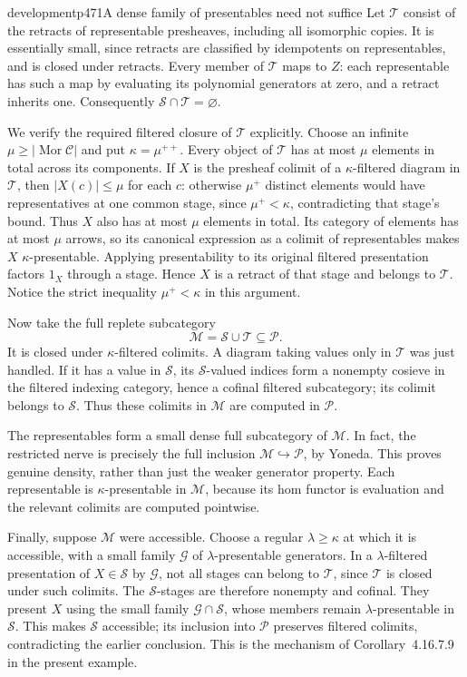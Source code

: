 \begin{dcomment}{development}{p471}{A dense family of presentables need not suffice}
Let $\mathcal T$ consist of the retracts of representable presheaves, including all isomorphic copies. It is essentially small, since retracts are classified by idempotents on representables, and is closed under retracts. Every member of $\mathcal T$ maps to $Z$: each representable has such a map by evaluating its polynomial generators at zero, and a retract inherits one. Consequently $\mathcal S\cap\mathcal T=\varnothing$.

We verify the required filtered closure of $\mathcal T$ explicitly. Choose an infinite $\mu\ge|\operatorname{Mor}\mathcal C|$ and put $\kappa=\mu^{++}$. Every object of $\mathcal T$ has at most $\mu$ elements in total across its components. If $X$ is the presheaf colimit of a $\kappa$-filtered diagram in $\mathcal T$, then $|X(c)|\le\mu$ for each $c$: otherwise $\mu^+$ distinct elements would have representatives at one common stage, since $\mu^+<\kappa$, contradicting that stage's bound. Thus $X$ also has at most $\mu$ elements in total. Its category of elements has at most $\mu$ arrows, so its canonical expression as a colimit of representables makes $X$ $\kappa$-presentable. Applying presentability to its original filtered presentation factors $1_X$ through a stage. Hence $X$ is a retract of that stage and belongs to $\mathcal T$. Notice the strict inequality $\mu^+<\kappa$ in this argument.

Now take the full replete subcategory
\[
 \mathcal M=\mathcal S\cup\mathcal T\subseteq\mathcal P.
\]
It is closed under $\kappa$-filtered colimits. A diagram taking values only in $\mathcal T$ was just handled. If it has a value in $\mathcal S$, its $\mathcal S$-valued indices form a nonempty cosieve in the filtered indexing category, hence a cofinal filtered subcategory; its colimit belongs to $\mathcal S$. Thus these colimits in $\mathcal M$ are computed in $\mathcal P$.

The representables form a small dense full subcategory of $\mathcal M$. In fact, the restricted nerve is precisely the full inclusion $\mathcal M\hookrightarrow\mathcal P$, by Yoneda. This proves genuine density, rather than just the weaker generator property. Each representable is $\kappa$-presentable in $\mathcal M$, because its hom functor is evaluation and the relevant colimits are computed pointwise.

Finally, suppose $\mathcal M$ were accessible. Choose a regular $\lambda\ge\kappa$ at which it is accessible, with a small family $\mathcal G$ of $\lambda$-presentable generators. In a $\lambda$-filtered presentation of $X\in\mathcal S$ by $\mathcal G$, not all stages can belong to $\mathcal T$, since $\mathcal T$ is closed under such colimits. The $\mathcal S$-stages are therefore nonempty and cofinal. They present $X$ using the small family $\mathcal G\cap\mathcal S$, whose members remain $\lambda$-presentable in $\mathcal S$. This makes $\mathcal S$ accessible; its inclusion into $\mathcal P$ preserves filtered colimits, contradicting the earlier conclusion. This is the mechanism of Corollary~4.16.7.9 in the present example.


\end{dcomment}
